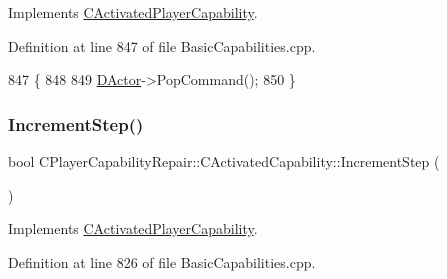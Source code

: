 Implements \hyperlink{classCActivatedPlayerCapability_a5cde83be468e262ad054d81e28684a81}{C\+Activated\+Player\+Capability}.



Definition at line 847 of file Basic\+Capabilities.\+cpp.


\begin{DoxyCode}
847                                                         \{
848 
849     \hyperlink{classCActivatedPlayerCapability_a54ca944b47bff2718330639941d402b0}{DActor}->PopCommand();
850 \}
\end{DoxyCode}
\hypertarget{classCPlayerCapabilityRepair_1_1CActivatedCapability_a5b5b42dbbda50b29e9f917df3cb0f650}{}\label{classCPlayerCapabilityRepair_1_1CActivatedCapability_a5b5b42dbbda50b29e9f917df3cb0f650} 
\subsubsection{\texorpdfstring{Increment\+Step()}{IncrementStep()}}
{\footnotesize\ttfamily bool C\+Player\+Capability\+Repair\+::\+C\+Activated\+Capability\+::\+Increment\+Step (\begin{DoxyParamCaption}{ }\end{DoxyParamCaption})\hspace{0.3cm}{\ttfamily [virtual]}}



Implements \hyperlink{classCActivatedPlayerCapability_a943b5999a57504399293250382c0ec6a}{C\+Activated\+Player\+Capability}.



Definition at line 826 of file Basic\+Capabilities.\+cpp.



